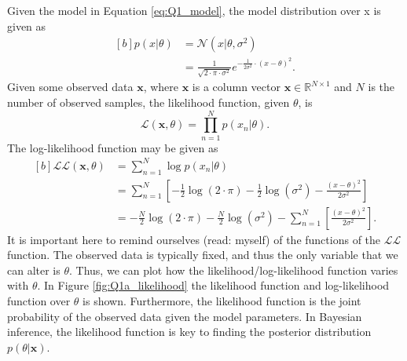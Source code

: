 \documentclass{article}
\begin{document}
Given the model in Equation \eqref{eq:Q1_model}, the model distribution over x is given as
\begin{equation}
\begin{aligned}[b]
p(x \vert \theta) &= \mathcal{N}(x \vert \theta, \sigma^2) \\
&= \frac{1}{\sqrt{2 \cdot \pi \cdot \sigma^2}} e^{-\frac{1}{2\sigma^2} \cdot \left( x - \theta \right)^2}.
\end{aligned}
\end{equation}
Given some observed data $\mathbf{x}$, where $\mathbf{x}$ is a column vector $\mathbf{x} \in \mathbb{R}^{N \times 1}$ and $N$ is the number of observed samples, the likelihood function, given $\theta$, is
\begin{equation}
\mathcal{L}(\mathbf{x}, \theta) = \prod_{n=1}^{N} p(x_n \vert \theta).
\end{equation}
The log-likelihood function may be given as
\begin{equation}
\begin{aligned}[b]
\mathcal{LL}(\mathbf{x}, \theta) &= \sum_{n=1}^{N} \log p(x_n \vert \theta) \\
&= \sum_{n=1}^{N} \left[ -\frac{1}{2}\log (2\cdot \pi) - \frac{1}{2}\log (\sigma^2) - \frac{\left( x - \theta \right)^2}{2\sigma^2} \right] \\
&= -\frac{N}{2}\log (2\cdot \pi) - \frac{N}{2}\log (\sigma^2) - \sum_{n=1}^{N} \left[\frac{\left( x - \theta \right)^2}{2\sigma^2} \right].
\end{aligned}
\end{equation}
It is important here to remind ourselves (read: myself) of the functions of the $\mathcal{LL}$ function. The observed data is typically fixed, and thus the only variable that we can alter is $\theta$. Thus, we can plot how the likelihood/log-likelihood function varies with $\theta$. In Figure \ref{fig:Q1a_likelihood} the likelihood function and log-likelihood function over $\theta$ is shown. Furthermore, the likelihood function is the joint probability of the observed data given the model parameters. In Bayesian inference, the likelihood function is key to finding the posterior distribution $p(\theta \vert \mathbf{x})$.
\end{document}
